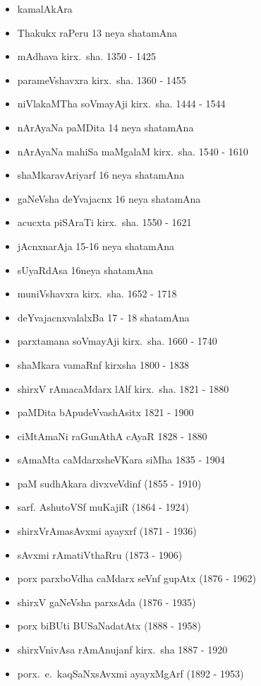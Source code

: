 {\begin{itemize}
\item kamalAkAra
\item Thakukx raPeru {\rm 13} neya shatamAna
\item mAdhava kirx.~sha. {\rm 1350 - 1425}
\item parameVshavxra kirx.~sha. {\rm 1360 - 1455}
\item niVlakaMTha soVmayAji kirx.~sha. {\rm 1444 - 1544}
\item nArAyaNa paMDita {\rm 14} neya shatamAna
\item nArAyaNa mahiSa maMgalaM kirx.~sha. {\rm 1540 - 1610}
\item shaMkaravAriyarf {\rm 16} neya shatamAna
\item gaNeVsha deYvajacnx {\rm 16} neya shatamAna
\item acucxta piSAraTi kirx.~sha. {\rm 1550 - 1621}
\item jAcnxnarAja {\rm 15-16} neya shatamAna
\item sUyaRdAsa {\rm 16}neya shatamAna
\item muniVshavxra kirx.~sha. {\rm 1652 - 1718}
\item deYvajacnxvalalxBa {\rm 17 - 18} shatamAna
\item parxtamana soVmayAji kirx.~sha. {\rm 1660 - 1740}
\item shaMkara vamaRnf kirxsha {\rm 1800 - 1838}
\item shirxV rAmacaMdarx lAlf kirx.~sha. {\rm 1821 - 1880}
\item paMDita bApudeVvashAsitx {\rm 1821 - 1900}
\item ciMtAmaNi raGunAthA cAyaR {\rm 1828 - 1880}
\item sAmaMta caMdarxsheVKara siMha {\rm 1835 - 1904}
\item paM sudhAkara divxveVdinf {\rm (1855 - 1910)}
\item sarf. AshutoVSf muKajiR {\rm (1864 - 1924)}
\item shirxVrAmasAvxmi ayayxrf {\rm (1871 - 1936)}
\item sAvxmi rAmatiVthaRru {\rm (1873 - 1906)}
\item porx parxboVdha caMdarx seVnf gupAtx {\rm (1876 - 1962)}
\item shirxV gaNeVsha parxsAda {\rm (1876 - 1935)}
\item porx biBUti BUSaNadatAtx {\rm (1888 - 1958)}
\item shirxVnivAsa rAmAnujanf kirx.~sha {\rm 1887 - 1920}
\item porx.~e.~kaqSaNxsAvxmi ayayxMgArf {\rm (1892 - 1953)}

\end{itemize}}
